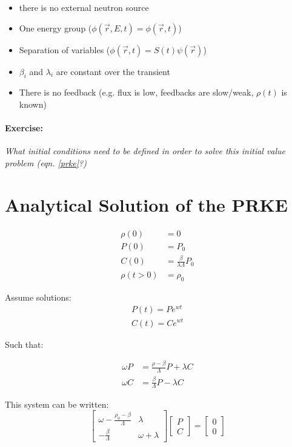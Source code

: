 \documentclass[12pt]{article}
\begin{document}
\begin{itemize}
\item there is no external neutron source
\item One energy group ($\phi(\vec{r},E,t) = \phi(\vec{r},t)$)
\item Separation of variables ($\phi(\vec{r},t) = S(t)\psi(\vec{r})$)
\item $\beta_i$ and $\lambda_i$ are constant over the transient
\item There is no feedback (e.g. flux is low, feedbacks are slow/weak, $\rho(t)$ is known)
\end{itemize}


\paragraph{Exercise:}
\emph{What initial conditions need to be defined in order to solve this initial 
value problem (eqn. \eqref{prke}?)}


\section{Analytical Solution of the PRKE}

\begin{align}
\rho(0) &= 0\\
P(0) &= P_0\\
C(0) &= \frac{\beta}{\lambda\Lambda}P_0\\
\rho(t>0) &= \rho_0
\end{align}

Assume solutions:
\begin{align}
P(t) = Pe^{wt}\\
C(t) = Ce^{wt}
\end{align}

Such that:

\begin{align}
\omega P &= \frac{\rho - \beta}{\Lambda} P + \lambda C\\
\omega C &= \frac{\beta}{\Lambda}P - \lambda C
\end{align}

This system can be written:
\[
\begin{bmatrix}
\omega - \frac{\rho_0-\beta}{\Lambda} & \lambda  \\
-\frac{\beta}{\Lambda} & \omega + \lambda
\end{bmatrix}
\begin{bmatrix}
P  \\
C  
\end{bmatrix}
=
\begin{bmatrix}
0  \\
0  
\end{bmatrix}
\]
\end{document}
